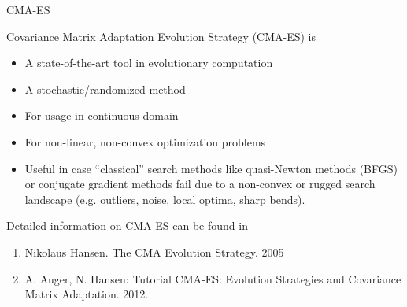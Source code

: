 \documentclass[11pt,compress,t,notes=noshow, xcolor=table]{beamer}
\begin{document}
\begin{vbframe}{CMA-ES}

Covariance Matrix Adaptation Evolution Strategy (CMA-ES) is

\begin{itemize}
\item A state-of-the-art tool in evolutionary computation 
\item A stochastic/randomized method
\item For usage in continuous domain
\item For non-linear, non-convex optimization problems
\item Useful in case \enquote{classical} search methods like quasi-Newton methods (BFGS) or conjugate gradient methods fail due to a non-convex or rugged search landscape (e.g. outliers, noise, local optima, sharp bends).
\end{itemize}

Detailed information on CMA-ES can be found in

\begin{enumerate}
\item Nikolaus Hansen. The CMA Evolution Strategy. 2005
\item A. Auger, N. Hansen: Tutorial CMA-ES: Evolution Strategies and Covariance Matrix Adaptation. 2012.
\end{enumerate}

\end{vbframe}
\end{document}
